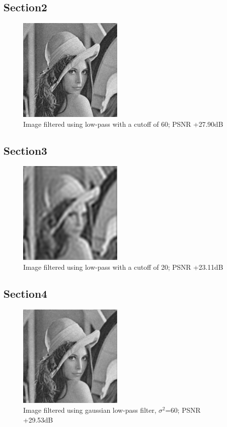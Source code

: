 \documentclass[article, 1.5space, letterpaper, 12pt, oneside, header, footer]{SydeClass}
\begin{document}
\subsection{Section2}
\begin{figure}[ht]
\centering
	\includegraphics[width=0.45\textwidth]{question5/2_lena_LFP_60}
	\caption{Image filtered using low-pass with a cutoff of 60; PSNR +27.90dB}
\end{figure}

\subsection{Section3}
\begin{figure}[ht]
\centering
	\includegraphics[width=0.45\textwidth]{question5/3_lena_LFP_20}
	\caption{Image filtered using low-pass with a cutoff of 20; PSNR +23.11dB}
\end{figure}

\subsection{Section4}
\begin{figure}[ht]
\centering
	\includegraphics[width=0.45\textwidth]{question5/4_lena_LFP_gauss60}
	\caption{Image filtered using gaussian low-pass filter, $\sigma^2$=60; PSNR +29.53dB}
\end{figure}
\end{document}
